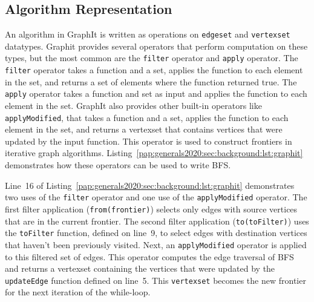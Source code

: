 \subsection{Algorithm Representation}
An algorithm in GraphIt is written as operations on \lstinline[language=graphit]{edgeset} and \lstinline[language=graphit]{vertexset} datatypes. 
Graphit provides several operators that perform computation on these types, but the most common are the \lstinline[language=graphit]{filter} operator and \lstinline[language=graphit]{apply} operator.
The \lstinline[language=graphit]{filter} operator takes a function and a set, applies the function to each element in the set, and returns a set of elements where the function returned true.
The \lstinline[language=graphit]{apply} operator takes a function and set as input and applies the function to each element in the set. %
GraphIt also provides other built-in operators like \lstinline[language=graphit]{applyModified}, that takes a function and a set, applies the function to each element in the set, and returns a vertexset that contains vertices that were updated by the input function. 
This operator is used to construct frontiers in iterative graph algorithms. 
Listing~\ref{pap:generals2020:sec:background:lst:graphit} demonstrates how these operators can be used to write BFS.

Line~16 of Listing~\ref{pap:generals2020:sec:background:lst:graphit} demonstrates two uses of the \lstinline[language=graphit]{filter} operator and one use of the \lstinline[language=graphit]{applyModified} operator. 
The first filter application (\lstinline[language=graphit]{from(frontier)}) selects only edges with source vertices that are in the current frontier. 
The second filter application (\lstinline[language=graphit]{to(toFilter)}) uses the \lstinline[language=graphit]{toFilter} function, defined on line~9, to select edges with destination vertices that haven't been previously visited.
Next, an \lstinline[language=graphit]{applyModified} operator is applied to this filtered set of edges.
This operator computes the edge traversal of BFS and returns a vertexset containing the vertices that were updated by the \lstinline[language=graphit]{updateEdge} function defined on line~5.
This \lstinline[language=graphit]{vertexset} becomes the new frontier for the next iteration of the while-loop.

